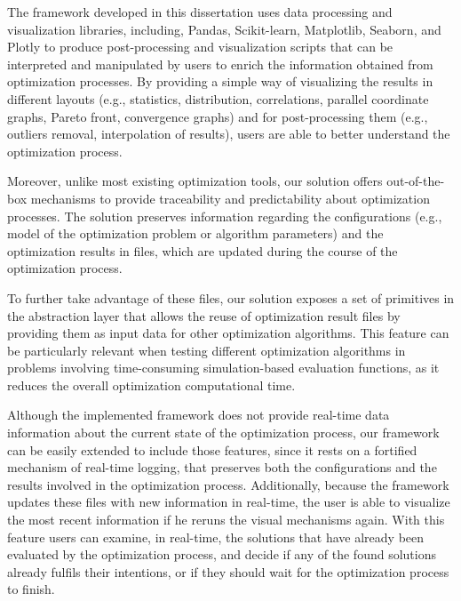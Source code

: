 The framework developed in this dissertation uses data processing and visualization libraries, including, Pandas, Scikit-learn, Matplotlib, Seaborn, and Plotly to produce post-processing and visualization scripts that can be interpreted and manipulated by users to enrich the information obtained from optimization processes. By providing a simple way of visualizing the results in different layouts (e.g., statistics, distribution, correlations, parallel coordinate graphs, Pareto front, convergence graphs) and for post-processing them (e.g., outliers removal, interpolation of results), users are able to better understand the optimization process. 

Moreover, unlike most existing optimization tools, our solution offers out-of-the-box mechanisms to provide traceability and predictability about optimization processes. The solution preserves information regarding the configurations (e.g., model of the optimization problem or algorithm parameters) and the optimization results in files, which are updated during the course of the optimization process. 

To further take advantage of these files, our solution exposes a set of primitives in the abstraction layer that allows the reuse of optimization result files by providing them as input data for other optimization algorithms. This feature can be particularly relevant when testing different optimization algorithms in problems involving time-consuming simulation-based evaluation functions, as it reduces the overall optimization computational time.


Although the implemented framework does not provide real-time data information about the current state of the optimization process, our framework can be easily extended to include those features, since it rests on a fortified mechanism of real-time logging, that preserves both the configurations and the results involved in the optimization process. Additionally, because the framework updates these files with new information in real-time, the user is able to visualize the most recent information if he reruns the visual mechanisms again. With this feature users can examine, in real-time, the solutions that have already been evaluated by the optimization process, and decide if any of the found solutions already fulfils their intentions, or if they should wait for the optimization process to finish. 

